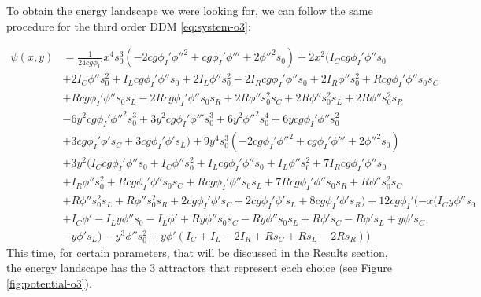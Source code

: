 \documentclass[12,twoside]{TFG-GM}
\theoremstyle{definition}
\theoremstyle{remark}
\begin{document}
To obtain the energy landscape we  were looking for, we can follow the same procedure for the third order DDM \eqref{eq:system-o3}:


\begin{equation}
\begin{aligned}
\psi(x,y)&= \frac{1}{24 c g \phi_I'} x^{4} s_{0}^{3} (- 2 c g \phi_I' \phi''^{2} + c g \phi_I' \phi''' + 2 \phi''^{2} s_{0}) + 2 x^{2} (I_{C} c g \phi_I' \phi'' s_{0}\\
&+ 2 I_{C} \phi'' s_{0}^{2} + I_{L} c g \phi_I' \phi'' s_{0} + 2 I_{L} \phi'' s_{0}^{2} - 2 I_{R} c g \phi_I' \phi'' s_{0} + 2 I_{R} \phi'' s_{0}^{2} + R c g \phi_I' \phi'' s_{0} s_{C}  \\
&+ R c g \phi_I' \phi'' s_{0} s_{L} - 2 R c g \phi_I' \phi'' s_{0} s_{R} + 2 R \phi'' s_{0}^{2} s_{C} + 2 R \phi'' s_{0}^{2} s_{L} + 2 R \phi'' s_{0}^{2} s_{R}\\
& - 6 y^{2} c g \phi_I' \phi''^{2} s_{0}^{3} + 3 y^{2} c g \phi_I' \phi''' s_{0}^{3} + 6 y^{2} \phi''^{2} s_{0}^{4} + 6 y c g \phi_I' \phi'' s_{0}^{2}  \\
& + 3 c g \phi_I' \phi' s_{C} + 3 c g \phi_I' \phi' s_{L}) + 9 y^{4} s_{0}^{3} (- 2 c g \phi_I' \phi''^{2} + c g \phi_I' \phi''' + 2 \phi''^{2} s_{0}) \\
& + 3 y^{2} (I_{C} c g \phi_I' \phi'' s_{0} + I_{C} \phi'' s_{0}^{2} + I_{L} c g \phi_I' \phi'' s_{0} + I_{L} \phi'' s_{0}^{2} + 7 I_{R} c g \phi_I' \phi'' s_{0}  \\
& +   I_{R} \phi'' s_{0}^{2} + R c g \phi_I' \phi'' s_{0} s_{C} + R c g \phi_I' \phi'' s_{0} s_{L} + 7 R c g \phi_I' \phi'' s_{0} s_{R} + R \phi'' s_{0}^{2} s_{C} \\
& + R \phi'' s_{0}^{2} s_{L} + R \phi'' s_{0}^{2} s_{R} + 2 c g \phi_I' \phi' s_{C} + 2 c g \phi_I' \phi' s_{L} + 8 c g \phi_I' \phi' s_{R}) + 12 c g \phi_I' (- x (I_{C} y \phi'' s_{0}\\
& + I_{C} \phi' - I_{L} y \phi'' s_{0} - I_{L} \phi' + R y \phi'' s_{0} s_{C} - R y \phi'' s_{0} s_{L} + R \phi' s_{C} - R \phi' s_{L} + y \phi' s_{C}  \\
& - y \phi' s_{L}) - y^{3} \phi'' s_{0}^{2} + y \phi' (I_{C} + I_{L} - 2 I_{R} + R s_{C} + R s_{L} - 2 R s_{R}))
\end{aligned}
\label{eq:potential-o3}
\end{equation}
This time, for certain parameters, that will be discussed in the Results section, the energy landscape has the 3 attractors that represent each choice (see Figure \ref{fig:potential-o3}).
\end{document}
